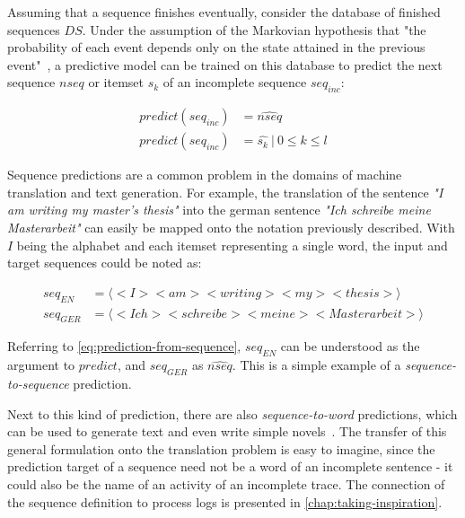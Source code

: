 Assuming that a sequence finishes eventually, consider the database of finished sequences $DS$. Under the assumption of the Markovian hypothesis that "the probability of each event depends only on the state attained in the previous event"~\cite{gagniuc2017markov}, a predictive model can be trained on this database to predict the next sequence $nseq$ or itemset $s_k$ of an incomplete sequence $seq_{inc}$:

\begin{equation}
\begin{split}
    predict(seq_{inc}) &= \widehat{nseq}\\
    predict(seq_{inc}) &= \hat{s_k}\ |\ 0 \leq k \leq l
\end{split}
\label{eq:prediction-from-sequence}
\end{equation}

Sequence predictions are a common problem in the domains of machine translation and text generation. For example, the translation of the sentence \textit{"I am writing my master's thesis"} into the german sentence \textit{"Ich schreibe meine Masterarbeit"} can easily be mapped onto the notation previously described. With $I$ being the alphabet and each itemset representing a single word, the input and target sequences could be noted as:

\begin{equation*}
\begin{split}
seq_{EN} &= \langle<I> <am> <writing> <my> <thesis>\rangle\\
seq_{GER} &= \langle<Ich> <schreibe> <meine> <Masterarbeit>\rangle
\end{split}
\end{equation*}

Referring to \autoref{eq:prediction-from-sequence}, $seq_{EN}$ can be understood as the argument to $predict$, and $seq_{GER}$ as $\widehat{nseq}$. This is a simple example of a \textit{sequence-to-sequence} prediction.

Next to this kind of prediction, there are also \textit{sequence-to-word} predictions, which can be used to generate text and even write simple novels~\cite{web:text-generation-machinelearningmastery, web:text-generation-freecodecamp}. The transfer of this general formulation onto the translation problem is easy to imagine, since the prediction target of a sequence need not be a word of an incomplete sentence - it could also be the name of an activity of an incomplete trace. The connection of the sequence definition to process logs is presented in \autoref{chap:taking-inspiration}.

